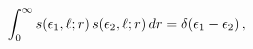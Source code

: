 \[\int_{0}^{\infty}\mathop{s\/}\nolimits\!\left(\epsilon_{1},\ell;r\right)%
\mathop{s\/}\nolimits\!\left(\epsilon_{2},\ell;r\right)dr=\mathop{\delta\/}%
\nolimits\!\left(\epsilon_{1}-\epsilon_{2}\right),\]